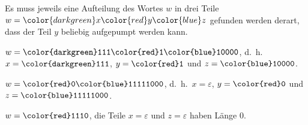 \begin{loesung}
Es muss jeweils eine Aufteilung des Wortes $w$ in drei Teile
$w={\color{darkgreen}x}{\color{red}y}{\color{blue}z}$ gefunden
werden derart, dass der Teil $y$ beliebig aufgepumpt werden kann.
\begin{teilaufgaben}
\item
$w=\texttt{{\color{darkgreen}111}{\color{red}1}{\color{blue}10000}}$,
d.~h.~$x=\texttt{\color{darkgreen}111}$, $y=\texttt{\color{red}1}$
und $z=\texttt{\color{blue}10000}$.
\item
$w=\texttt{{\color{red}0}{\color{blue}11111000}}$,
d.~h.~$x=\varepsilon$, $y=\texttt{\color{red}0}$ und
$z=\texttt{\color{blue}11111000}$.
\item
$w=\texttt{\color{red}1110}$, die Teile $x=\varepsilon$ und $z=\varepsilon$
haben Länge $0$.
\qedhere
\end{teilaufgaben}
\end{loesung}
